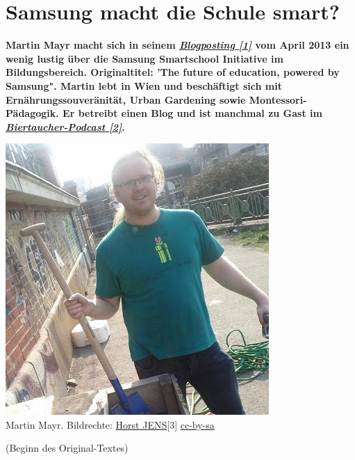 \section*{Samsung macht die Schule smart?}
\hypertarget{smartschool}{}
\label{smartschool}

\textbf{Martin Mayr macht sich in seinem \href{http://martinslangweiligesblog.wordpress.com/2013/04/01/the-future-of-education-powered-by-samsung/}{\textit{Blogposting [1]}} vom April 2013 ein wenig lustig über die Samsung Smartschool Initiative im Bildungsbereich. Originaltitel: 'The future of education, powered by Samsung". Martin lebt in Wien und beschäftigt sich mit Ernährungssouveränität, Urban Gardening sowie Montessori-Pädagogik. Er betreibt einen Blog und ist manchmal zu Gast im \href{http://biertaucher.at}{\textit{Biertaucher-Podcast [2]}}.}

\begin{center}
\includegraphics[width=\linewidth]{smartschool/martinderm2.jpg} \\
\footnotesize{Martin Mayr. Bildrechte: \href{http://spielend-programmieren.at}{Horst JENS}[3] \href{http://creativecommons.org/licenses/by-sa/3.0/}{cc-by-sa}}
\end{center}

(Beginn des Original-Textes)\\

